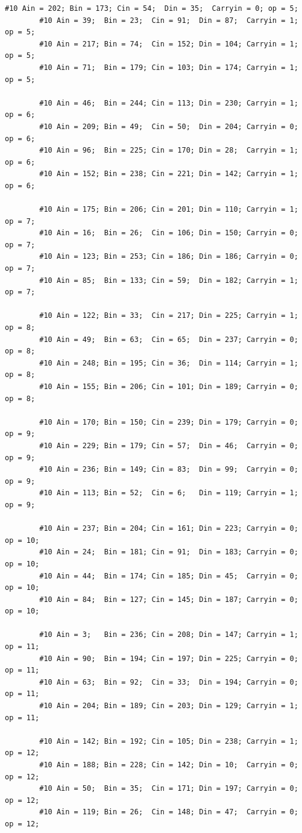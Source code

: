 \documentclass[12pt]{jreport}
\begin{document}
\begin{center}
\begin{lstlisting}[basicstyle=\ttfamily\footnotesize, frame=single]
        #10 Ain = 202; Bin = 173; Cin = 54;  Din = 35;  Carryin = 0; op = 5;
        #10 Ain = 39;  Bin = 23;  Cin = 91;  Din = 87;  Carryin = 1; op = 5;
        #10 Ain = 217; Bin = 74;  Cin = 152; Din = 104; Carryin = 1; op = 5;
        #10 Ain = 71;  Bin = 179; Cin = 103; Din = 174; Carryin = 1; op = 5;
  
        #10 Ain = 46;  Bin = 244; Cin = 113; Din = 230; Carryin = 1; op = 6;
        #10 Ain = 209; Bin = 49;  Cin = 50;  Din = 204; Carryin = 0; op = 6;
        #10 Ain = 96;  Bin = 225; Cin = 170; Din = 28;  Carryin = 1; op = 6;
        #10 Ain = 152; Bin = 238; Cin = 221; Din = 142; Carryin = 1; op = 6;
  
        #10 Ain = 175; Bin = 206; Cin = 201; Din = 110; Carryin = 1; op = 7;
        #10 Ain = 16;  Bin = 26;  Cin = 106; Din = 150; Carryin = 0; op = 7;
        #10 Ain = 123; Bin = 253; Cin = 186; Din = 186; Carryin = 0; op = 7;
        #10 Ain = 85;  Bin = 133; Cin = 59;  Din = 182; Carryin = 1; op = 7;
  
        #10 Ain = 122; Bin = 33;  Cin = 217; Din = 225; Carryin = 1; op = 8;
        #10 Ain = 49;  Bin = 63;  Cin = 65;  Din = 237; Carryin = 0; op = 8;
        #10 Ain = 248; Bin = 195; Cin = 36;  Din = 114; Carryin = 1; op = 8;
        #10 Ain = 155; Bin = 206; Cin = 101; Din = 189; Carryin = 0; op = 8;
  
        #10 Ain = 170; Bin = 150; Cin = 239; Din = 179; Carryin = 0; op = 9;
        #10 Ain = 229; Bin = 179; Cin = 57;  Din = 46;  Carryin = 0; op = 9;
        #10 Ain = 236; Bin = 149; Cin = 83;  Din = 99;  Carryin = 0; op = 9;
        #10 Ain = 113; Bin = 52;  Cin = 6;   Din = 119; Carryin = 1; op = 9;
  
        #10 Ain = 237; Bin = 204; Cin = 161; Din = 223; Carryin = 0; op = 10;
        #10 Ain = 24;  Bin = 181; Cin = 91;  Din = 183; Carryin = 0; op = 10;
        #10 Ain = 44;  Bin = 174; Cin = 185; Din = 45;  Carryin = 0; op = 10;
        #10 Ain = 84;  Bin = 127; Cin = 145; Din = 187; Carryin = 0; op = 10;
  
        #10 Ain = 3;   Bin = 236; Cin = 208; Din = 147; Carryin = 1; op = 11;
        #10 Ain = 90;  Bin = 194; Cin = 197; Din = 225; Carryin = 0; op = 11;
        #10 Ain = 63;  Bin = 92;  Cin = 33;  Din = 194; Carryin = 0; op = 11;
        #10 Ain = 204; Bin = 189; Cin = 203; Din = 129; Carryin = 1; op = 11;
  
        #10 Ain = 142; Bin = 192; Cin = 105; Din = 238; Carryin = 1; op = 12;
        #10 Ain = 188; Bin = 228; Cin = 142; Din = 10;  Carryin = 0; op = 12;
        #10 Ain = 50;  Bin = 35;  Cin = 171; Din = 197; Carryin = 0; op = 12;
        #10 Ain = 119; Bin = 26;  Cin = 148; Din = 47;  Carryin = 0; op = 12;
  

\end{lstlisting}
\end{center}
\end{document}
